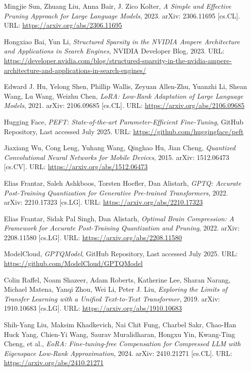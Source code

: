 \begin{thebibliography}{9}
	Mingjie Sun, Zhuang Liu, Anna Bair, J. Zico Kolter,
	\textit{A Simple and Effective Pruning Approach for Large Language Models},
	2023. arXiv: 2306.11695 [cs.CL]. URL: \url{https://arxiv.org/abs/2306.11695}

	Hongxiao Bai, Yun Li,
	\textit{Structured Sparsity in the NVIDIA Ampere Architecture and Applications in Search Engines},
	NVIDIA Developer Blog, 2023. URL: \url{https://developer.nvidia.com/blog/structured-sparsity-in-the-nvidia-ampere-architecture-and-applications-in-search-engines/}

	Edward J. Hu, Yelong Shen, Phillip Wallis, Zeyuan Allen-Zhu, Yuanzhi Li, Shean Wang, Lu Wang, Weizhu Chen,
	\textit{LoRA: Low-Rank Adaptation of Large Language Models},
	2021. arXiv: 2106.09685 [cs.CL]. URL: \url{https://arxiv.org/abs/2106.09685}

	Hugging Face,
	\textit{PEFT: State-of-the-art Parameter-Efficient Fine-Tuning},
	GitHub Repository, Last accessed July 2025. URL: \url{https://github.com/huggingface/peft}

	Jiaxiang Wu, Cong Leng, Yuhang Wang, Qinghao Hu, Jian Cheng,
	\textit{Quantized Convolutional Neural Networks for Mobile Devices},
	2015. arXiv: 1512.06473 [cs.CV]. URL: \url{https://arxiv.org/abs/1512.06473}

	Elias Frantar, Saleh Ashkboos, Torsten Hoefler, Dan Alistarh,
	\textit{GPTQ: Accurate Post-Training Quantization for Generative Pre-trained Transformers},
	2022. arXiv: 2210.17323 [cs.LG]. URL: \url{https://arxiv.org/abs/2210.17323}

	Elias Frantar, Sidak Pal Singh, Dan Alistarh,
	\textit{Optimal Brain Compression: A Framework for Accurate Post-Training Quantization and Pruning},
	2022. arXiv: 2208.11580 [cs.LG]. URL: \url{https://arxiv.org/abs/2208.11580}

	ModelCloud,
	\textit{GPTQModel},
	GitHub Repository, Last accessed July 2025. URL: \url{https://github.com/ModelCloud/GPTQModel}

	Colin Raffel, Noam Shazeer, Adam Roberts, Katherine Lee, Sharan Narang, Michael Matena, Yanqi Zhou, Wei Li, Peter J. Liu,
	\textit{Exploring the Limits of Transfer Learning with a Unified Text-to-Text Transformer},
	2019. arXiv: 1910.10683 [cs.LG]. URL: \url{https://arxiv.org/abs/1910.10683}

	Shih-Yang Liu, Maksim Khadkevich, Nai Chit Fung, Charbel Sakr, Chao-Han Huck Yang, Chien-Yi Wang, Saurav Muralidharan, Hongxu Yin, Kwang-Ting Cheng, et al.,
	\textit{EoRA: Fine-tuning-free Compensation for Compressed LLM with Eigenspace Low-Rank Approximation},
	2024. arXiv: 2410.21271 [cs.CL]. URL: \url{https://arxiv.org/abs/2410.21271}


\end{thebibliography}

